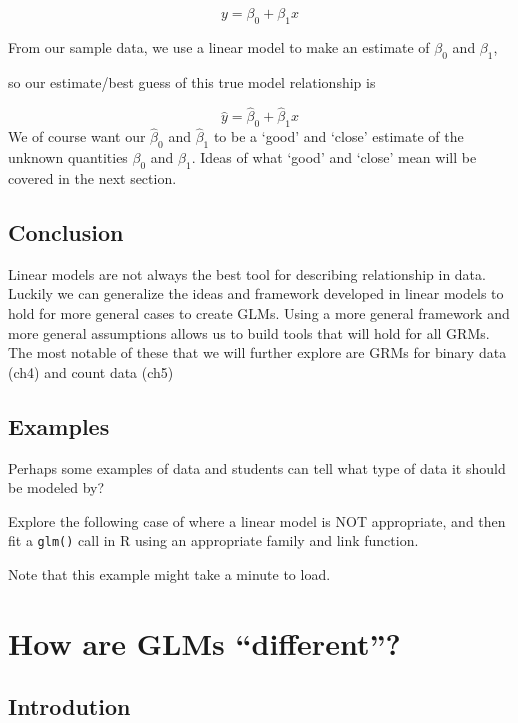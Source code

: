 \documentclass[
]{book}
\begin{document}
\[ y = \beta_0 + \beta_1 x\]

From our sample data, we use a linear model to make an estimate of \(\beta_0\) and \(\beta_1\),

so our estimate/best guess of this true model relationship is

\[ \hat y = \hat\beta_0 + \hat\beta_1 x\]
We of course want our \(\hat\beta_0\) and \(\hat\beta_1\) to be a `good' and `close' estimate of the unknown quantities \(\beta_0\) and \(\beta_1\). Ideas of what `good' and `close' mean will be covered in the next section.

\hypertarget{conclusion}{%
\section{Conclusion}\label{conclusion}}

Linear models are not always the best tool for describing relationship in data. Luckily we can generalize the ideas and framework developed in linear models to hold for more general cases to create GLMs. Using a more general framework and more general assumptions allows us to build tools that will hold for all GRMs. The most notable of these that we will further explore are GRMs for binary data (ch4) and count data (ch5)

\hypertarget{examples}{%
\section{Examples}\label{examples}}

Perhaps some examples of data and students can tell what type of data it should be modeled by?

Explore the following case of where a linear model is NOT appropriate, and then fit a \texttt{glm()} call in R using an appropriate family and link function.

Note that this example might take a minute to load.

\hypertarget{how-are-glms-different}{%
\chapter{How are GLMs ``different''?}\label{how-are-glms-different}}

\hypertarget{introdution}{%
\section{Introdution}\label{introdution}}
\end{document}

